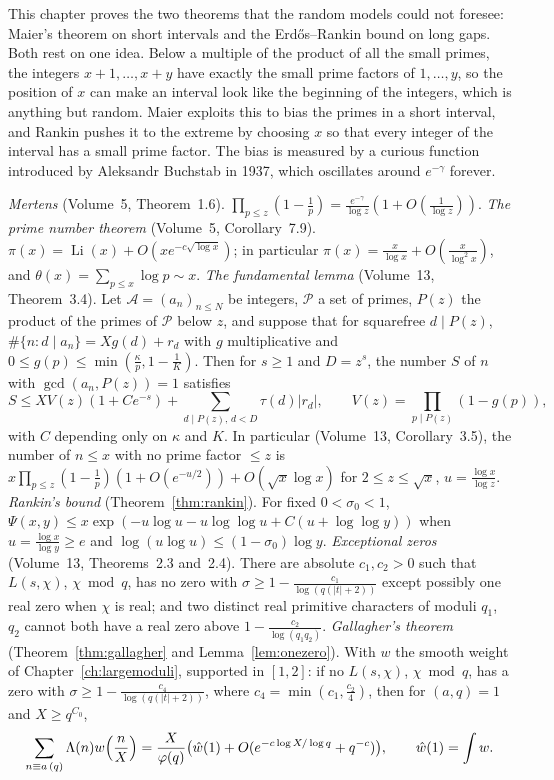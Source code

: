This chapter proves the two theorems that the random models could not foresee: Maier's theorem on short intervals and the Erd\H{o}s--Rankin bound on long gaps. Both rest on one idea. Below a multiple of the product of all the small primes, the integers $x+1,\dots,x+y$ have exactly the small prime factors of $1,\dots,y$, so the position of $x$ can make an interval look like the beginning of the integers, which is anything but random. Maier exploits this to bias the primes in a short interval, and Rankin pushes it to the extreme by choosing $x$ so that every integer of the interval has a small prime factor. The bias is measured by a curious function introduced by Aleksandr Buchstab in 1937, which oscillates around $e^{-\gamma}$ forever.

\begin{reminder}
\emph{Mertens} (Volume~5, Theorem~1.6). $\prod_{p\le z}(1-\frac1p)=\frac{e^{-\gamma}}{\log z}(1+O(\frac1{\log z}))$.
\emph{The prime number theorem} (Volume~5, Corollary~7.9). $\pi(x)=\operatorname{Li}(x)+O(xe^{-c\sqrt{\log x}})$; in particular $\pi(x)=\frac x{\log x}+O(\frac x{\log^2x})$, and $\theta(x)=\sum_{p\le x}\log p\sim x$.
\emph{The fundamental lemma} (Volume~13, Theorem~3.4). Let $\mathcal A=(a_n)_{n\le N}$ be integers, $\mathcal P$ a set of primes, $P(z)$ the product of the primes of $\mathcal P$ below $z$, and suppose that for squarefree $d\mid P(z)$, $\#\{n:d\mid a_n\}=Xg(d)+r_d$ with $g$ multiplicative and $0\le g(p)\le\min(\frac\kappa p,1-\frac1K)$. Then for $s\ge1$ and $D=z^s$, the number $S$ of $n$ with $\gcd(a_n,P(z))=1$ satisfies
\[
S\le XV(z)(1+Ce^{-s})+\sum_{d\mid P(z),\,d<D}\tau(d)|r_d|,\qquad V(z)=\prod_{p\mid P(z)}(1-g(p)),
\]
with $C$ depending only on $\kappa$ and $K$. In particular (Volume~13, Corollary~3.5), the number of $n\le x$ with no prime factor $\le z$ is $x\prod_{p\le z}(1-\frac1p)(1+O(e^{-u/2}))+O(\sqrt x\log x)$ for $2\le z\le\sqrt x$, $u=\frac{\log x}{\log z}$.
\emph{Rankin's bound} (Theorem~\ref{thm:rankin}). For fixed $0<\sigma_0<1$, $\Psi(x,y)\le x\exp(-u\log u-u\log\log u+C(u+\log\log y))$ when $u=\frac{\log x}{\log y}\ge e$ and $\log(u\log u)\le(1-\sigma_0)\log y$.
\emph{Exceptional zeros} (Volume~13, Theorems~2.3 and~2.4). There are absolute $c_1,c_2>0$ such that $L(s,\chi)$, $\chi\bmod q$, has no zero with $\sigma\ge1-\frac{c_1}{\log(q(|t|+2))}$ except possibly one real zero when $\chi$ is real; and two distinct real primitive characters of moduli $q_1$, $q_2$ cannot both have a real zero above $1-\frac{c_2}{\log(q_1q_2)}$.
\emph{Gallagher's theorem} (Theorem~\ref{thm:gallagher} and Lemma~\ref{lem:onezero}). With $w$ the smooth weight of Chapter~\ref{ch:largemoduli}, supported in $[1,2]$: if no $L(s,\chi)$, $\chi\bmod q$, has a zero with $\sigma\ge1-\frac{c_4}{\log(q(|t|+2))}$, where $c_4=\min(c_1,\frac{c_2}4)$, then for $(a,q)=1$ and $X\ge q^{C_0}$,
\[
\sum_{n\equiv a\,(q)}\Lambda(n)w\Bigl(\frac nX\Bigr)=\frac X{\varphi(q)}\bigl(\hat w(1)+O(e^{-c\log X/\log q}+q^{-c})\bigr),\qquad\hat w(1)=\int w.
\]
\end{reminder}

